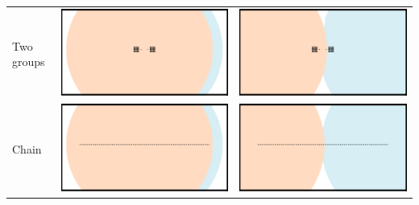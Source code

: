 \documentclass[a4paper,10pt]{article}
\begin{document}
\begin{table}[h]
\begin{tabular}{lcc}
Two groups&\includegraphics[width=\imgSize]{../images/5StaticEnv/environments/staticEnv3}&\includegraphics[width=\imgSize]{../images/5StaticEnv/environments/staticEnv4}\\
Chain&\includegraphics[width=\imgSize]{../images/5StaticEnv/environments/staticEnv1}&\includegraphics[width=\imgSize]{../images/5StaticEnv/environments/staticEnv2}\\
\end{tabular}
\label{tab:gt}


\end{table}
\end{document}
